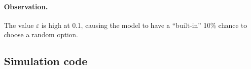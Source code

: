 \documentclass{article}
\begin{document}
\paragraph{Observation. } The value $\varepsilon$ is high at 0.1, causing the model to have a ``built-in'' 10\% chance to choose a random option.

\subsection{Simulation code}
\newline
{}
\end{document}
